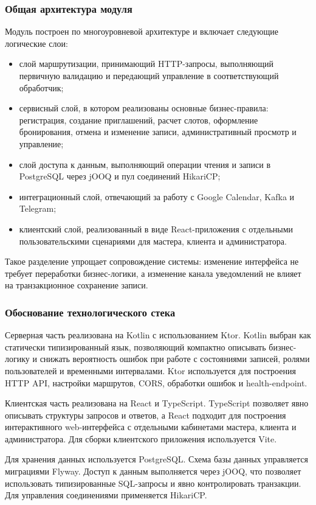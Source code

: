\subsubsection{Общая архитектура модуля}

Модуль построен по многоуровневой архитектуре и включает следующие логические слои:
\begin{itemize}
\item слой маршрутизации, принимающий HTTP-запросы, выполняющий первичную валидацию и передающий управление в соответствующий обработчик;
\item сервисный слой, в котором реализованы основные бизнес-правила: регистрация, создание приглашений, расчет слотов, оформление бронирования, отмена и изменение записи, административный просмотр и управление;
\item слой доступа к данным, выполняющий операции чтения и записи в PostgreSQL через jOOQ и пул соединений HikariCP;
\item интеграционный слой, отвечающий за работу с Google Calendar, Kafka и Telegram;
\item клиентский слой, реализованный в виде React-приложения с отдельными пользовательскими сценариями для мастера, клиента и администратора.
\end{itemize}

Такое разделение упрощает сопровождение системы: изменение интерфейса не требует переработки бизнес-логики, а изменение канала уведомлений не влияет на транзакционное сохранение записи.

\subsubsection{Обоснование технологического стека}

Серверная часть реализована на Kotlin с использованием Ktor. Kotlin выбран как статически типизированный язык, позволяющий компактно описывать бизнес-логику и снижать вероятность ошибок при работе с состояниями записей, ролями пользователей и временными интервалами. Ktor используется для построения HTTP API, настройки маршрутов, CORS, обработки ошибок и health-endpoint.

Клиентская часть реализована на React и TypeScript. TypeScript позволяет явно описывать структуры запросов и ответов, а React подходит для построения интерактивного web-интерфейса с отдельными кабинетами мастера, клиента и администратора. Для сборки клиентского приложения используется Vite.

Для хранения данных используется PostgreSQL. Схема базы данных управляется миграциями Flyway. Доступ к данным выполняется через jOOQ, что позволяет использовать типизированные SQL-запросы и явно контролировать транзакции. Для управления соединениями применяется HikariCP.

